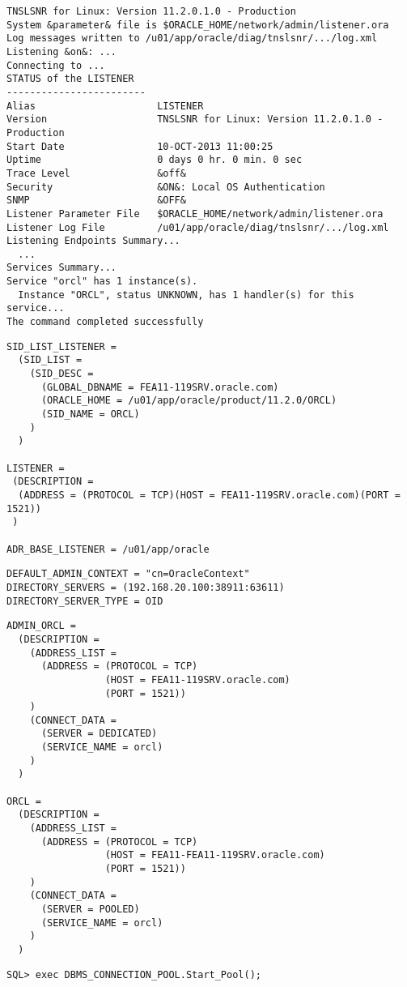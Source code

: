 \begin{enumerate}
\begin{lstlisting}[language=terminal]
TNSLSNR for Linux: Version 11.2.0.1.0 - Production
System &parameter& file is $ORACLE_HOME/network/admin/listener.ora
Log messages written to /u01/app/oracle/diag/tnslsnr/.../log.xml
Listening &on&: ...
Connecting to ...
STATUS of the LISTENER
------------------------
Alias                     LISTENER
Version                   TNSLSNR for Linux: Version 11.2.0.1.0 - Production
Start Date                10-OCT-2013 11:00:25
Uptime                    0 days 0 hr. 0 min. 0 sec
Trace Level               &off&
Security                  &ON&: Local OS Authentication
SNMP                      &OFF&
Listener Parameter File   $ORACLE_HOME/network/admin/listener.ora
Listener Log File         /u01/app/oracle/diag/tnslsnr/.../log.xml
Listening Endpoints Summary...
  ...
Services Summary...
Service "orcl" has 1 instance(s).
  Instance "ORCL", status UNKNOWN, has 1 handler(s) for this service...
The command completed successfully
      \end{lstlisting}
\clearpage
    
      \begin{lstlisting}[caption={listener.ora},language=configfile]
SID_LIST_LISTENER =
  (SID_LIST =
    (SID_DESC =
      (GLOBAL_DBNAME = FEA11-119SRV.oracle.com)
      (ORACLE_HOME = /u01/app/oracle/product/11.2.0/ORCL)
      (SID_NAME = ORCL)
    )
  )

LISTENER =
 (DESCRIPTION =
  (ADDRESS = (PROTOCOL = TCP)(HOST = FEA11-119SRV.oracle.com)(PORT = 1521))
 )

ADR_BASE_LISTENER = /u01/app/oracle
      \end{lstlisting}
    
      \begin{lstlisting}[caption={ldap.ora},language=configfile]
DEFAULT_ADMIN_CONTEXT = "cn=OracleContext"
DIRECTORY_SERVERS = (192.168.20.100:38911:63611)
DIRECTORY_SERVER_TYPE = OID
      \end{lstlisting}
    
\clearpage
    
      \begin{lstlisting}[caption={tnsnames.ora},language=configfile]
ADMIN_ORCL =
  (DESCRIPTION =
    (ADDRESS_LIST =
      (ADDRESS = (PROTOCOL = TCP)
                 (HOST = FEA11-119SRV.oracle.com)
                 (PORT = 1521))
    )
    (CONNECT_DATA =
      (SERVER = DEDICATED)
      (SERVICE_NAME = orcl)
    )
  )

ORCL =
  (DESCRIPTION =
    (ADDRESS_LIST =
      (ADDRESS = (PROTOCOL = TCP)
                 (HOST = FEA11-FEA11-119SRV.oracle.com)
                 (PORT = 1521))
    )
    (CONNECT_DATA =
      (SERVER = POOLED)
      (SERVICE_NAME = orcl)
    )
  )
      \end{lstlisting}
      \begin{lstlisting}[caption={Connection Pooling aktivieren in SQL*Plus},language=oracle_sql] 
SQL> exec DBMS_CONNECTION_POOL.Start_Pool();
      \end{lstlisting}
  \end{enumerate}
